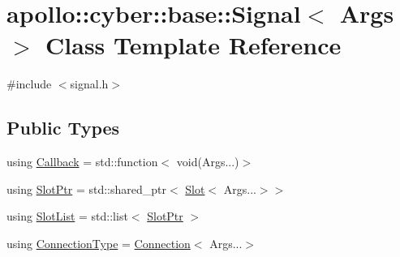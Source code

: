\hypertarget{classapollo_1_1cyber_1_1base_1_1Signal}{\section{apollo\-:\-:cyber\-:\-:base\-:\-:Signal$<$ Args $>$ Class Template Reference}
\label{classapollo_1_1cyber_1_1base_1_1Signal}
}


{\ttfamily \#include $<$signal.\-h$>$}

\subsection*{Public Types}
\begin{DoxyCompactItemize}
\item 
using \hyperlink{classapollo_1_1cyber_1_1base_1_1Signal_a85f3c9d95bb2885c4d09cce1542ab049}{Callback} = std\-::function$<$ void(Args...)$>$
\item 
using \hyperlink{classapollo_1_1cyber_1_1base_1_1Signal_a3d4274b14dd47e0a5186b3c8005fe676}{Slot\-Ptr} = std\-::shared\-\_\-ptr$<$ \hyperlink{classapollo_1_1cyber_1_1base_1_1Slot}{Slot}$<$ Args...$>$$>$
\item 
using \hyperlink{classapollo_1_1cyber_1_1base_1_1Signal_a902c7f3a2c9bd9debeb0d7a52dc501bf}{Slot\-List} = std\-::list$<$ \hyperlink{classapollo_1_1cyber_1_1base_1_1Signal_a3d4274b14dd47e0a5186b3c8005fe676}{Slot\-Ptr} $>$
\item 
using \hyperlink{classapollo_1_1cyber_1_1base_1_1Signal_a4fb76535f693654bd1afd5d338d85193}{Connection\-Type} = \hyperlink{classapollo_1_1cyber_1_1base_1_1Connection}{Connection}$<$ Args...$>$
\end{DoxyCompactItemize}

